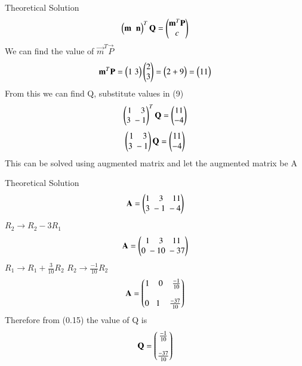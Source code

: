 \documentclass{beamer}
\begin{document}
\begin{frame}{Theoretical Solution}
    \begin{align}
             \begin{pmatrix}\mathbf{m}\;\;\mathbf{n}\end{pmatrix}^T\mathbf{Q}=\begin{pmatrix}\mathbf{m}^T\mathbf{P}\\c\end{pmatrix}
         \end{align}
         We can find the value of $\vec{m}^T\vec{P}$
         \begin{align}
             \mathbf{m}^T\mathbf{P}=\begin{pmatrix}1\;3\end{pmatrix}\begin{pmatrix}2\\3\end{pmatrix}=\begin{pmatrix}2+9\end{pmatrix}=\begin{pmatrix}11\end{pmatrix}
         \end{align}
         From this we can find Q, substitute values in (9)
         \begin{align}
             \begin{pmatrix}1\;\;\;\;3\\3\;-1\end{pmatrix}^T\mathbf{Q}=\begin{pmatrix}11\\-4\end{pmatrix}
         \end{align}
         \begin{align}
             \begin{pmatrix}1\;\;\;\;3\\3\;-1\end{pmatrix}\mathbf{Q}=\begin{pmatrix}11\\-4\end{pmatrix}
         \end{align}
         This can be solved using augmented matrix and let the augmented matrix be A
\end{frame}
\begin{frame}{Theoretical Solution}
    \begin{align}
             \mathbf{A}=\begin{pmatrix}1\;\;\;\;3\;\;\;\;11\\3\;-1\;-4\end{pmatrix}
         \end{align}
         $R_2\rightarrow{R_2-3R_1}$
         \begin{align}
             \mathbf{A}=\begin{pmatrix}1\;\;\;\;3\;\;\;\;11\\0\;-10\;-37\end{pmatrix}
         \end{align}
         $R_1\rightarrow{R_1+\frac{3}{10}R_2}$ \hspace{1cm}
         $R_2\rightarrow{\frac{-1}{10}R_2}$
         \begin{align}
             \mathbf{A}=\begin{pmatrix}1\;\;\;\;0\;\;\;\;\frac{-1}{10}\\\\0\;\;\;1\;\;\;\;\frac{-37}{10}\end{pmatrix}
         \end{align}
         Therefore from (0.15) the value of Q is
         \begin{align}
             \mathbf{Q}=\begin{pmatrix}\frac{-1}{10}\\\\ \frac{-37}{10}\end{pmatrix}
         \end{align}
\end{frame}
\end{document}
